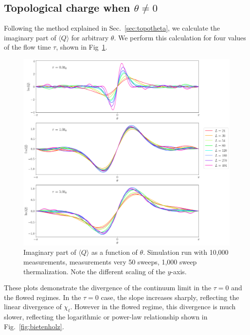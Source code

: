 \subsection{Topological charge when $\theta\neq 0$}
Following the method explained in Sec.~\ref{sec:topotheta}, we calculate the imaginary part of $\langle Q \rangle$ for arbitrary $\theta$. We perform this calculation for four values of the flow time $\tau$, shown in Fig~\ref{fig:theta}.
\begin{figure}[h]
    \centering
      \includegraphics[width=\textwidth]{imgs/theta.png}
      \caption{\label{fig:theta} Imaginary part of $\langle Q \rangle$ as a function of $\theta$. Simulation run with 10,000 measurements, measurements very 50 sweeps, 1,000 sweep thermalization. Note the different scaling of the $y$-axis.}
\end{figure}
These plots demonstrate the divergence of the continuum limit in the $\tau=0$ and the flowed regimes. In the $\tau=0$ case, the slope increases sharply, reflecting the linear divergence of $\chi_t$. However in the flowed regime, this divergence is much slower, reflecting the logarithmic or power-law relationship shown in Fig.~\ref{fig:bietenholz}.


